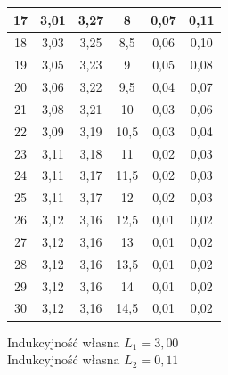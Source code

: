 \documentclass[a4paper,10pt,twoside]{article}
\begin{document}
\begin{table}[htb]
\begin{tabular}{|c|c|c|c|c|c|}
		17     & 3,01       & 3,27 & 8       & 0,07                          & 0,11                      \\ \hline
		18     & 3,03       & 3,25 & 8,5     & 0,06                          & 0,10                      \\ \hline
		19     & 3,05       & 3,23 & 9       & 0,05                          & 0,08                      \\ \hline
		20     & 3,06       & 3,22 & 9,5     & 0,04                          & 0,07                      \\ \hline
		21     & 3,08       & 3,21 & 10      & 0,03                          & 0,06                      \\ \hline
		22     & 3,09       & 3,19 & 10,5    & 0,03                          & 0,04                      \\ \hline
		23     & 3,11       & 3,18 & 11      & 0,02                          & 0,03                      \\ \hline
		24     & 3,11       & 3,17 & 11,5    & 0,02                          & 0,03                      \\ \hline
		25     & 3,11       & 3,17 & 12      & 0,02                          & 0,03                      \\ \hline
		26     & 3,12       & 3,16 & 12,5    & 0,01                          & 0,02                      \\ \hline
		27     & 3,12       & 3,16 & 13      & 0,01                          & 0,02                      \\ \hline
		28     & 3,12       & 3,16 & 13,5    & 0,01                          & 0,02                      \\ \hline
		29     & 3,12       & 3,16 & 14      & 0,01                          & 0,02                      \\ \hline
		30     & 3,12       & 3,16 & 14,5    & 0,01                          & 0,02                      \\ \hline
	\end{tabular}
\end{table}
\noindent
Indukcyjność własna $L_1 = 3,00$\\
Indukcyjność własna $L_2 = 0,11$

 \newpage
	
\end{document}

